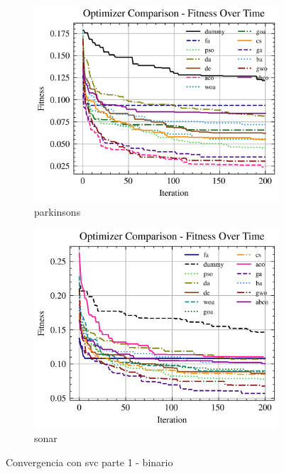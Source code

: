 \begin{figure}[htp]
    \begin{subfigure}[htp]{0.45\textwidth}
        \includegraphics[width=\textwidth]{imagenes/fitness_charts/img/binary/parkinsons/optimizers_fitness_svc.png}
        \caption{parkinsons}
    \end{subfigure}
    \begin{subfigure}[htp]{0.45\textwidth}
        \includegraphics[width=\textwidth]{imagenes/fitness_charts/img/binary/sonar/optimizers_fitness_svc.png}
        \caption{sonar}
    \end{subfigure}
    \caption{Convergencia con svc parte 1 - binario}
    \label{fig:convergencia_svc_1_bin}
\end{figure}

